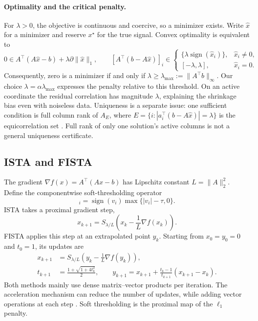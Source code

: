 \documentclass{article}
\begin{document}
\paragraph{Optimality and the critical penalty.}
For $\lambda>0$, the objective is continuous and coercive, so a minimizer exists. Write $\widehat x$ for a minimizer and reserve $x^\star$ for the true signal. Convex optimality is equivalent to
\begin{equation}
0\in A^\top(A\widehat x-b)+\lambda\partial\|\widehat x\|_1,
\qquad
[A^\top(b-A\widehat x)]_i\in
\begin{cases}
\{\lambda\operatorname{sign}(\widehat x_i)\},&\widehat x_i\ne0,\\
[-\lambda,\lambda],&\widehat x_i=0.
\end{cases}
\end{equation}
Consequently, zero is a minimizer if and only if $\lambda\ge\lambda_{\max}:=\|A^\top b\|_\infty$. Our choice $\lambda=\alpha\lambda_{\max}$ expresses the penalty relative to this threshold. On an active coordinate the residual correlation has magnitude $\lambda$, explaining the shrinkage bias even with noiseless data. Uniqueness is a separate issue: one sufficient condition is full column rank of $A_E$, where $E=\{i:|a_i^\top(b-A\widehat x)|=\lambda\}$ is the equicorrelation set \citep{tibshirani2013}. Full rank of only one solution's active columns is not a general uniqueness certificate.

\subsection{ISTA and FISTA}
The gradient $\nabla f(x)=A^\top(Ax-b)$ has Lipschitz constant $L=\|A\|_2^2$. Define the componentwise soft-thresholding operator
\begin{equation}
 [S_\tau(v)]_i=\operatorname{sign}(v_i)\max\{|v_i|-\tau,0\}.
\end{equation}
ISTA takes a proximal gradient step,
\begin{equation}
 x_{k+1}=S_{\lambda/L}\!\left(x_k-\frac{1}{L}\nabla f(x_k)\right).
\end{equation}
FISTA applies this step at an extrapolated point $y_k$. Starting from $x_0=y_0=0$ and $t_0=1$, its updates are
\begin{align}
 x_{k+1}&=S_{\lambda/L}\!\left(y_k-\frac{1}{L}\nabla f(y_k)\right),\\
 t_{k+1}&=\frac{1+\sqrt{1+4t_k^2}}{2},\qquad
 y_{k+1}=x_{k+1}+\frac{t_k-1}{t_{k+1}}(x_{k+1}-x_k).
\end{align}
Both methods mainly use dense matrix--vector products per iteration. The acceleration mechanism can reduce the number of updates, while adding vector operations at each step \citep{beck2009}. Soft thresholding is the proximal map of the $\ell_1$ penalty.
\end{document}
